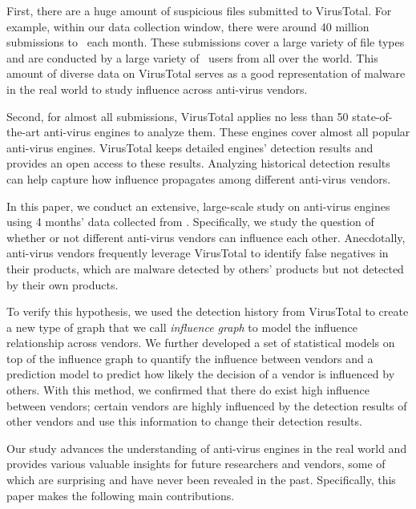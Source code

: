First, there are a huge amount of suspicious files submitted to VirusTotal. 
For example, within our data collection window, 
there were around 40 million submissions to \vt\ each month. 
These submissions cover a large variety of file types and 
are conducted by a large variety of \vt\ users from all over the world. 
This amount of diverse data on VirusTotal serves as a 
good representation of malware in the real world to study influence across anti-virus vendors. 

Second, for almost all submissions, 
VirusTotal applies no less than 50 state-of-the-art anti-virus engines to analyze them. 
These engines cover almost all popular anti-virus engines.
VirusTotal keeps detailed engines' detection results and provides an open access to these results. 
Analyzing historical detection results can help capture how influence propagates among different anti-virus vendors. 

In this paper, we conduct an extensive, 
large-scale study on anti-virus engines
using 4 months’ data collected from \vt.
Specifically, we study the question of whether or not different anti-virus vendors can influence each other.
Anecdotally, anti-virus vendors frequently leverage VirusTotal to identify false negatives in their products, 
which are malware detected by others' products but not detected by their own products. 

To verify this hypothesis, we used the detection history from VirusTotal to create a new type of graph that we call 
{\em influence graph} to model the influence relationship across vendors.
We further developed a set of statistical models on top of the influence graph to quantify the influence between vendors
and a prediction model to predict how likely the decision of a vendor is influenced by others. 
With this method, we confirmed that there do exist high influence between vendors;
certain vendors are highly influenced by the detection results of other vendors 
and use this information to change their detection results.

Our study advances the understanding of anti-virus engines in the real world 
and provides various valuable insights for future researchers and vendors, 
some of which are surprising and have never been revealed in the past.
Specifically, this paper makes the following main contributions.


